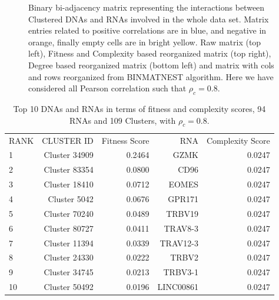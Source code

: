 \documentclass[10pt,a4paper]{article}
\begin{document}
\begin{figure}[h!]
\begin{center}
{%
}
\end{center}
\caption{\label{fig:fig1}Binary bi-adjacency matrix representing the interactions between Clustered DNAs and RNAs involved in the whole data set. Matrix entries related to positive correlations are in blue, and negative in orange, finally empty cells are in bright yellow. Raw matrix (top left), Fitness and Complexity based reorganized matrix (top right), Degree based reorganized matrix (bottom left) and matrix with cols and rows reorganized from BINMATNEST algorithm. Here we have considered all Pearson correlation such that $\rho_{c} = 0.8$.}
\end{figure}
 \begin{table}[h!]
\centering
\caption{\label{tab:tab4} Top 10 DNAs and RNAs in terms of fitness and complexity scores, 94 RNAs and 109 Clusters, with $\rho_{c} = 0.8$.}
\begin{tabular}{l|rr|rr|}
\cline{1-5}
RANK & CLUSTER ID & Fitness Score & RNA & Complexity Score\\
\cline{1-5}
1 & Cluster 34909 & 0.2464 & GZMK & 0.0247\\
2 & Cluster 83354 & 0.0800 & CD96 & 0.0247\\
3 & Cluster 18410 & 0.0712 & EOMES & 0.0247\\
4 & Cluster 5042 & 0.0676 & GPR171 & 0.0247\\
5 & Cluster 70240 & 0.0489 & TRBV19 & 0.0247\\
6 & Cluster 80727 & 0.0411 & TRAV8-3 & 0.0247\\
7 & Cluster 11394 & 0.0339 & TRAV12-3 & 0.0247\\
8 & Cluster 24330 & 0.0222 & TRBV2 & 0.0247\\
9 & Cluster 34745 & 0.0213 & TRBV3-1 & 0.0247\\
10 & Cluster 50492 & 0.0196 & LINC00861 & 0.0247\\
\cline{1-5}
\end{tabular}
\end{table}
\end{document}

